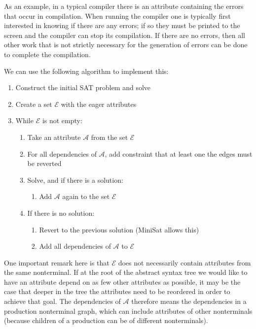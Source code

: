 \documentclass{llncs}
\begin{document}
As an example, in a typical compiler there is an attribute containing the errors that occur in compilation. When running the compiler one is typically first interested in knowing if there are any errors; if so they must be printed to the screen and the compiler can stop its compilation. If there are no errors, then all other work that is not strictly necessary for the generation of errors can be done to complete the compilation.

We can use the following algorithm to implement this:
\begin{enumerate}
\item Construct the initial SAT problem and solve
\item Create a set $\mathcal{E}$ with the eager attributes
\item While $\mathcal{E}$ is not empty:
\begin{enumerate}
\item Take an attribute $\mathcal{A}$ from the set $\mathcal{E}$
\item For all dependencies of $\mathcal{A}$, add constraint that at least one the edges must be reverted
\item Solve, and if there is a solution:
\begin{enumerate}
\item Add $\mathcal{A}$ again to the set $\mathcal{E}$
\end{enumerate}
\item If there is no solution:
\begin{enumerate}
\item Revert to the previous solution (MiniSat allows this)
\item Add all dependencies of $\mathcal{A}$ to $\mathcal{E}$
\end{enumerate}
\end{enumerate}
\end{enumerate}

One important remark here is that $\mathcal{E}$ does not necessarily contain attributes from the same nonterminal. If at the root of the abstract syntax tree we would like to have an attribute depend on as few other attributes as possible, it may be the case that deeper in the tree the attributes need to be reordered in order to achieve that goal. The dependencies of $\mathcal{A}$ therefore means the dependencies in a production nonterminal graph, which can include attributes of other nonterminals (because children of a production can be of different nonterminals).
\end{document}
